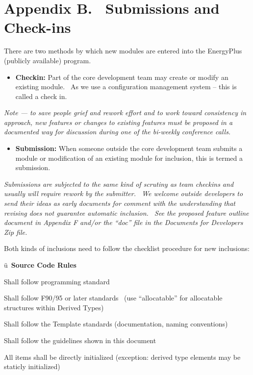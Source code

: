 \chapter{Appendix B.~ Submissions and Check-ins}\label{appendix-b.-submissions-and-check-ins}

There are two methods by which new modules are entered into the EnergyPlus (publicly available) program.

\begin{itemize}
\tightlist
\item
  \textbf{Checkin:} Part of the core development team may create or modify an existing module.~ As we use a configuration management system -- this is called a check in.
\end{itemize}

\emph{Note --- to save people grief and rework effort and to work toward consistency in approach, new features or changes to existing features must be proposed in a documented way for discussion during one of the bi-weekly conference calls.}

\begin{itemize}
\tightlist
\item
  \textbf{Submission:} When someone outside the core development team submits a module or modification of an existing module for inclusion, this is termed a submission.
\end{itemize}

\emph{Submissions are subjected to the same kind of scrutiny as team checkins and usually will require rework by the submitter.~ We welcome outside developers to send their ideas as early documents for comment with the understanding that revising does not guarantee automatic inclusion.~ See the proposed feature outline document in Appendix F and/or the ``doc'' file in the Documents for Developers Zip file.}

Both kinds of inclusions need to follow the checklist procedure for new inclusions:

ü~\textbf{Source Code Rules}

Shall follow programming standard

Shall follow F90/95 or later standards~ (use ``allocatable'' for allocatable structures within Derived Types)

Shall follow the Template standards (documentation, naming conventions)

Shall follow the guidelines shown in this document

All items shall be directly initialized (exception: derived type elements may be staticly initialized)

